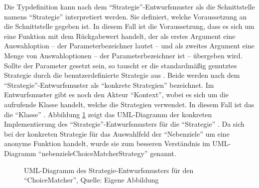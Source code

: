 Die Typdefinition   kann nach dem \enquote{Strategie}-Entwurfsmuster als die Schnittstelle namens \enquote{Strategie} interpretiert werden.
Sie definiert, welche Voraussetzung an die Schnittstelle gegeben ist.
In diesem Fall ist die Voraussetzung, dass es sich um eine Funktion mit dem Rückgabewert  handelt,
der als erstes Argument eine Auswahloption
-- der Parameterbezeichner lautet  --
und als zweites Argument eine Menge von Auswahloptionen
-- der Parameterbezeichner ist  --
übergeben wird.
Sollte der Parameter  gesetzt sein,
so tauscht er die standardmäßig genutztes Strategie  durch die benutzerdefinierte Strategie aus .
Beide werden nach dem \enquote{Strategie}-Entwurfsmuster als \enquote{konkrete Strategien} bezeichnet.
Im Entwurfsmuster gibt es noch den Akteur \enquote{Kontext},
wobei es sich um die aufrufende Klasse handelt,
welche die Strategien verwendet.
In diesem Fall ist das die \enquote{Klasse} .
Abbildung \ref{fig:UmlChoiceMatcherStrategyPattern} zeigt das UML-Diagramm der konkreten Implementierung des \enquote{Strategie}-Entwurfsmusters für die \enquote{Strategie} .
Da sich bei der konkreten Strategie für das Auswahlfeld der \enquote{Nebenziele} um eine anonyme Funktion handelt,
wurde sie zum besseren Verständnis im UML-Diagramm \enquote{nebenzieleChoiceMatcherStrategy} genannt.
\ifIncludeFigures
  \begin{figure}[h]
    \centering


    \caption[UML-Diagramm des Strategie-Entwurfsmusters für den \enquote{ChoiceMatcher}]{UML-Diagramm des Strategie-Entwurfsmusters für den \enquote{ChoiceMatcher}, Quelle: Eigene Abbildung}
    \label{fig:UmlChoiceMatcherStrategyPattern}

  \end{figure}%
\fi

